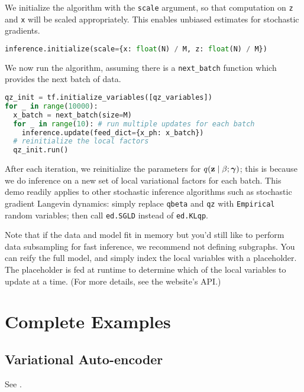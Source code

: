 We initialize the algorithm with the \texttt{scale} argument, so that
computation on \texttt{z} and \texttt{x} will be scaled appropriately.
This enables unbiased estimates for stochastic gradients.
\begin{lstlisting}[language=Python]
inference.initialize(scale={x: float(N) / M, z: float(N) / M})
\end{lstlisting}
We now run the algorithm, assuming there is a \texttt{next_batch}
function which provides the next batch of data.
\begin{lstlisting}[language=Python]
qz_init = tf.initialize_variables([qz_variables])
for _ in range(10000):
  x_batch = next_batch(size=M)
  for _ in range(10): # run multiple updates for each batch
    inference.update(feed_dict={x_ph: x_batch})
  # reinitialize the local factors
  qz_init.run()
\end{lstlisting}
After each iteration, we reinitialize the parameters for
$q(\mathbf{z}\mid\beta; \boldsymbol{\mathbf{\gamma}})$; this is because we do inference on a new
set of local variational factors for each batch.
This demo readily applies to other stochastic inference
algorithms such as stochastic gradient Langevin dynamics: simply
replace \texttt{qbeta} and \texttt{qz} with \texttt{Empirical} random
variables; then call \texttt{ed.SGLD} instead of \texttt{ed.KLqp}.

Note that if the data and model fit in memory but you'd still like to
perform data subsampling for fast inference, we recommend not defining
subgraphs. You can reify the full model, and simply index the local
variables with a placeholder. The placeholder is fed at runtime to
determine which of the local variables to update at a time. (For more
details, see the website's API.)

\section{Complete Examples}
\label{appendix:complete}

\subsection{Variational Auto-encoder}
\label{appendix:vae}

See .

